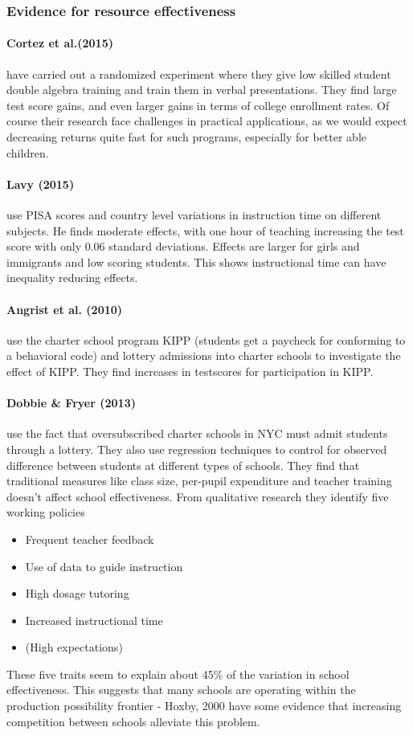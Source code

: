 \documentclass[12pt, a4paper]{article}
\begin{document}
\begin{multicols}{2}
\subsubsection{Evidence for resource effectiveness}
\paragraph{Cortez et al.(2015)} have carried out a randomized experiment where they give low skilled student double algebra training and train them in verbal presentations. They find large test score gains, and even larger gains in terms of college enrollment rates. Of course their research face challenges in practical applications, as we would expect decreasing returns quite fast for such programs, especially for better able children.

\paragraph{Lavy (2015)} use PISA scores and country level variations in instruction time on different subjects. He finds moderate effects, with one hour of teaching increasing the test score with only 0.06 standard deviations. Effects are larger for girls and immigrants and low scoring students. This shows instructional time can have inequality reducing effects.

\paragraph{Angrist et al. (2010)} use the charter school program KIPP (students get a paycheck for conforming to a behavioral code) and lottery admissions into charter schools to investigate the effect of KIPP. They find increases in testscores for participation in KIPP.

\paragraph{Dobbie \& Fryer (2013)} use the fact that oversubscribed charter schools in NYC must admit students through a lottery. They also use regression techniques to control for observed difference between students at different types of schools. They find that traditional measures like class size, per-pupil expenditure and teacher training doesn't affect school effectiveness. From qualitative research they identify five working policies
\begin{itemize}
\item Frequent teacher feedback
\item Use of data to guide instruction
\item High dosage tutoring
\item Increased instructional time
\item (High expectations)
\end{itemize}
These five traits seem to explain about 45\% of the variation in school effectiveness. This suggests that many schools are operating within the production possibility frontier - Hoxby, 2000 have some evidence that increasing competition between schools alleviate this problem.


\end{multicols}
\end{document}
